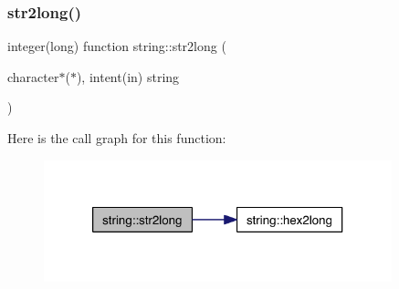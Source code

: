 \mbox{\label{namespacestring_aefd9037a03dddf650cb9d0a18ed7de95}} 
\subsubsection{\texorpdfstring{str2long()}{str2long()}}
{\footnotesize\ttfamily integer(long) function string\+::str2long (\begin{DoxyParamCaption}\item[{character$\ast$($\ast$), intent(in)}]{string }\end{DoxyParamCaption})\hspace{0.3cm}{\ttfamily [private]}}

Here is the call graph for this function\+:\nopagebreak
\begin{figure}[H]
\begin{center}
\leavevmode
\includegraphics[width=286pt]{namespacestring_aefd9037a03dddf650cb9d0a18ed7de95_cgraph}
\end{center}
\end{figure}
